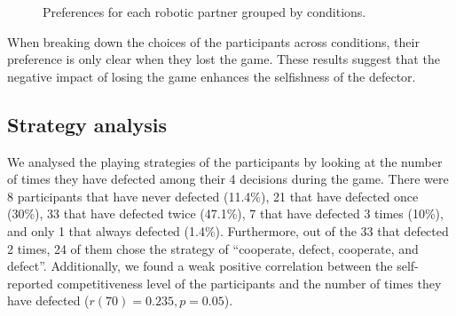 \begin{figure}[ht]
\centering

\caption{Preferences for each robotic partner grouped by conditions.}
\label{fig:preferences}
\end{figure}

When breaking down the choices of the participants across conditions, their preference is only clear when they lost the game. These results suggest that the negative impact of losing the game enhances the selfishness of the defector.


\subsection{Strategy analysis}
We analysed the playing strategies of the participants by looking at the number of times they have defected among their 4 decisions during the game. There were 8 participants that have never defected (11.4\%), 21 that have defected once (30\%), 33 that have defected twice (47.1\%), 7 that have defected 3 times (10\%), and only 1 that always defected (1.4\%). Furthermore, out of the 33 that defected 2 times, 24 of them chose the strategy of ``cooperate, defect, cooperate, and defect''. Additionally, we found a weak positive correlation between the self-reported competitiveness level of the participants and the number of times they have defected ($r(70)=0.235, p=0.05$).


